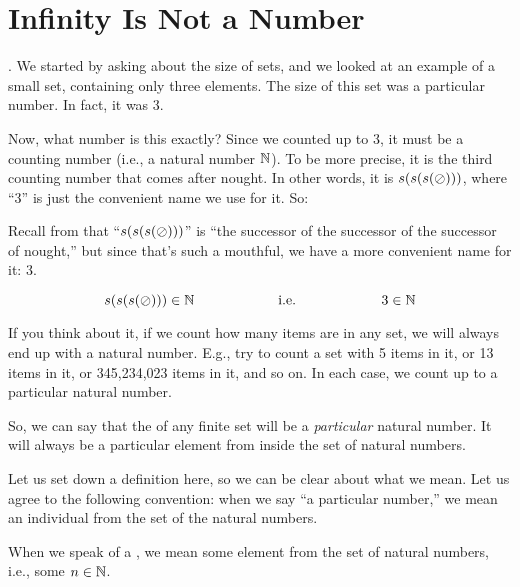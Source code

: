 \documentclass[../../../main.tex]{subfiles}
\begin{document}
\section{Infinity Is Not a Number}

. We started by asking about the size of sets, and we looked at an example of a small set, containing only three elements. The size of this set was a particular number. In fact, it was $3$. 

Now, what number is this exactly? Since we counted up to $3$, it must be a counting number (i.e., a natural number $\Nats/$). To be more precise, it is the third counting number that comes after nought. In other words, it is $\s{\s{\s{\nought/}}}$, where ``$3$'' is just the convenient name we use for it. So:

\begin{aside}
  \begin{remark}
    Recall from  that ``$\s{\s{\s{\nought/}}}$'' is ``the successor of the successor of the successor of nought,'' but since that's such a mouthful, we have a more convenient name for it: 3. 
  \end{remark}
\end{aside}

\begin{equation*}
  \s{\s{\s{\nought/}}} \in \Nats/ \hskip 2cm
  \text{ i.e. } \hskip 2cm
  3 \in \Nats/
\end{equation*}

If you think about it, if we count how many items are in any  set, we will always end up with a natural number. E.g., try to count a set with 5 items in it, or 13 items in it, or 345,234,023 items in it, and so on. In each case, we count up to a particular natural number.

So, we can say that the  of any finite set will be a \emph{particular} natural number. It will always be a particular element from inside the set of natural numbers.

Let us set down a definition here, so we can be clear about what we mean. Let us agree to the following convention: when we say ``a particular number,'' we mean an individual  from the set of the natural numbers.

\begin{terminology}
  When we speak of a , we mean some element from the set of natural numbers, i.e., some $n \in \Nats/$.
\end{terminology}
\end{document}
